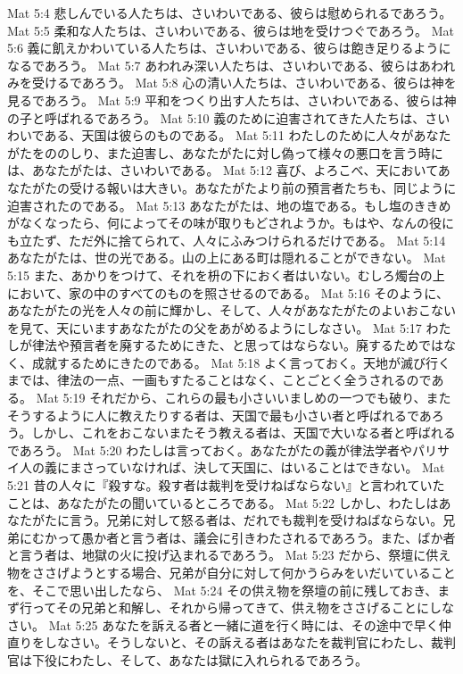 Mat 5:4  悲しんでいる人たちは、さいわいである、彼らは慰められるであろう。
Mat 5:5  柔和な人たちは、さいわいである、彼らは地を受けつぐであろう。
Mat 5:6  義に飢えかわいている人たちは、さいわいである、彼らは飽き足りるようになるであろう。
Mat 5:7  あわれみ深い人たちは、さいわいである、彼らはあわれみを受けるであろう。
Mat 5:8  心の清い人たちは、さいわいである、彼らは神を見るであろう。
Mat 5:9  平和をつくり出す人たちは、さいわいである、彼らは神の子と呼ばれるであろう。
Mat 5:10  義のために迫害されてきた人たちは、さいわいである、天国は彼らのものである。
Mat 5:11  わたしのために人々があなたがたをののしり、また迫害し、あなたがたに対し偽って様々の悪口を言う時には、あなたがたは、さいわいである。
Mat 5:12  喜び、よろこべ、天においてあなたがたの受ける報いは大きい。あなたがたより前の預言者たちも、同じように迫害されたのである。
Mat 5:13  あなたがたは、地の塩である。もし塩のききめがなくなったら、何によってその味が取りもどされようか。もはや、なんの役にも立たず、ただ外に捨てられて、人々にふみつけられるだけである。
Mat 5:14  あなたがたは、世の光である。山の上にある町は隠れることができない。
Mat 5:15  また、あかりをつけて、それを枡の下におく者はいない。むしろ燭台の上において、家の中のすべてのものを照させるのである。
Mat 5:16  そのように、あなたがたの光を人々の前に輝かし、そして、人々があなたがたのよいおこないを見て、天にいますあなたがたの父をあがめるようにしなさい。
Mat 5:17  わたしが律法や預言者を廃するためにきた、と思ってはならない。廃するためではなく、成就するためにきたのである。
Mat 5:18  よく言っておく。天地が滅び行くまでは、律法の一点、一画もすたることはなく、ことごとく全うされるのである。
Mat 5:19  それだから、これらの最も小さいいましめの一つでも破り、またそうするように人に教えたりする者は、天国で最も小さい者と呼ばれるであろう。しかし、これをおこないまたそう教える者は、天国で大いなる者と呼ばれるであろう。
Mat 5:20  わたしは言っておく。あなたがたの義が律法学者やパリサイ人の義にまさっていなければ、決して天国に、はいることはできない。
Mat 5:21  昔の人々に『殺すな。殺す者は裁判を受けねばならない』と言われていたことは、あなたがたの聞いているところである。
Mat 5:22  しかし、わたしはあなたがたに言う。兄弟に対して怒る者は、だれでも裁判を受けねばならない。兄弟にむかって愚か者と言う者は、議会に引きわたされるであろう。また、ばか者と言う者は、地獄の火に投げ込まれるであろう。
Mat 5:23  だから、祭壇に供え物をささげようとする場合、兄弟が自分に対して何かうらみをいだいていることを、そこで思い出したなら、
Mat 5:24  その供え物を祭壇の前に残しておき、まず行ってその兄弟と和解し、それから帰ってきて、供え物をささげることにしなさい。
Mat 5:25  あなたを訴える者と一緒に道を行く時には、その途中で早く仲直りをしなさい。そうしないと、その訴える者はあなたを裁判官にわたし、裁判官は下役にわたし、そして、あなたは獄に入れられるであろう。

